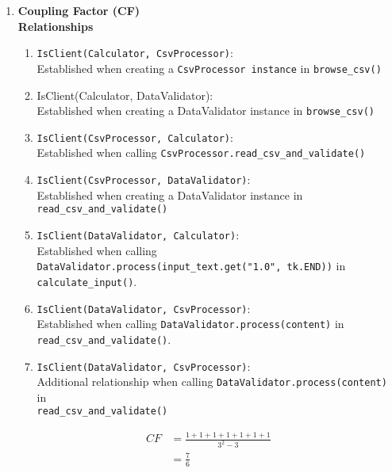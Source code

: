 \begin{enumerate}
\item\textbf{Coupling Factor (CF)}\\
\textbf{Relationships}
\begin{enumerate}
    \item \texttt{IsClient(Calculator, CsvProcessor)}: \\
    Established when creating a \texttt{CsvProcessor instance} in \texttt{browse\_csv()}
    \item IsClient(Calculator, DataValidator): \\
    Established when creating a DataValidator instance in \texttt{browse\_csv()}
    \item \texttt{IsClient(CsvProcessor, Calculator)}: \\
    Established when calling \texttt{CsvProcessor.read\_csv\_and\_validate()}
    \item \texttt{IsClient(CsvProcessor, DataValidator)}:\\ Established when creating a DataValidator instance in \texttt{read\_csv\_and\_validate()}
    \item \texttt{IsClient(DataValidator, Calculator)}: \\
    Established when calling \texttt{DataValidator.process(input\_text.get("1.0", tk.END))} in \texttt{calculate\_input()}.
    \item \texttt{IsClient(DataValidator, CsvProcessor)}: \\
    Established when calling \texttt{DataValidator.process(content)} in \texttt{read\_csv\_and\_validate()}.
    \item \texttt{IsClient(DataValidator, CsvProcessor)}: \\
    Additional relationship when calling \texttt{DataValidator.process(content)} in \\\texttt{read\_csv\_and\_validate()}
\end{enumerate}
\vspace{10pt}
\begin{align}
    CF  &= \frac{1+1+1+1+1+1+1}{3^{2}-3} \\        
        &= \frac{7}{6}
\end{align}


\end{enumerate}
